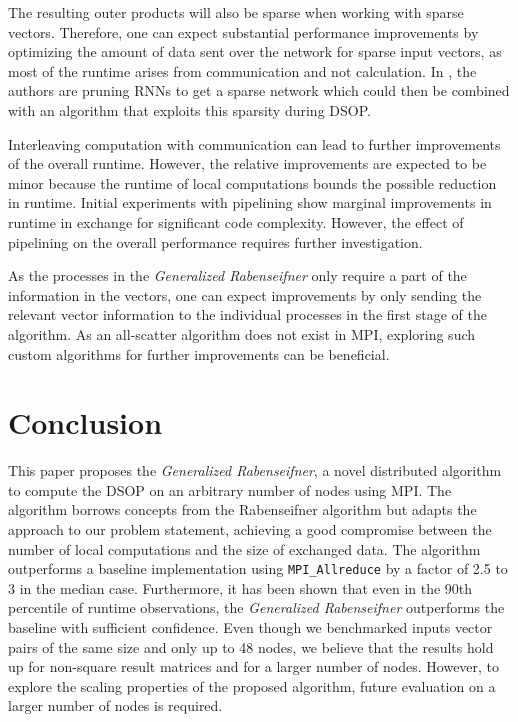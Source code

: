 \documentclass[letterpaper]{article}
\newcommand{\grabenseifner}{\textit{Generalized Rabenseifner}}
\begin{document}

The resulting outer products will also be sparse when working with sparse vectors. Therefore, one can expect substantial performance improvements by optimizing the amount of data sent over the network for sparse input vectors, as most of the runtime arises from communication and not calculation. In \cite{narang2017exploring}, the authors are pruning RNNs to get a sparse network which could then be combined with an algorithm that exploits this sparsity during DSOP.


Interleaving computation with communication can lead to further improvements of the overall runtime.
However, the relative improvements are expected to be minor because the runtime of local computations bounds the possible reduction in runtime.
Initial experiments with pipelining show marginal improvements in runtime in exchange for significant code complexity.
However, the effect of pipelining on the overall performance requires further investigation.


As the processes in the \grabenseifner{} only require a part of the information in the vectors, one can expect improvements by only sending the relevant vector information to the individual processes in the first stage of the algorithm. As an all-scatter algorithm does not exist in MPI, exploring such custom algorithms for further improvements can be beneficial.

\section{Conclusion}

This paper proposes the \grabenseifner{}, a novel distributed algorithm to compute the DSOP on an arbitrary number of nodes using MPI. The algorithm borrows concepts from the Rabenseifner algorithm but adapts the approach to our problem statement, achieving a good compromise between the number of local computations and the size of exchanged data. The algorithm outperforms a baseline implementation using \verb|MPI_Allreduce| by a factor of 2.5 to 3 in the median case. Furthermore, it has been shown that even in the 90th percentile of runtime observations, the \grabenseifner{} outperforms the baseline with sufficient confidence.
Even though we benchmarked inputs vector pairs of the same size and only up to 48 nodes, we believe that the results hold up for non-square result matrices and for a larger number of nodes.
However, to explore the scaling properties of the proposed algorithm, future evaluation on a larger number of nodes is required.
\end{document}

